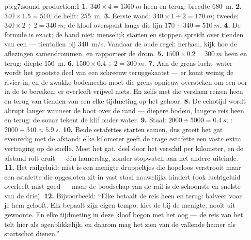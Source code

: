 \begin{solution}{pb:g7:sound-production:1}
\textbf{1.} $340 \times 4 = \qty{1360}{m}$ heen en terug: breedte
\qty{680}{m}.
\textbf{2.} $340 \times 1.5 = 510$; de helft: \qty{255}{m}.
\textbf{3.} Eerste wand: $340 \times 1 \div 2 = \qty{170}{m}$; tweede:
$340 \times 2 \div 2 = \qty{340}{m}$; de kloof overspant langs die lijn
$170 + 340 = \qty{510}{m}$.
\textbf{4.} De formule is exact; de hand niet: menselijk starten en
stoppen spreidt over tienden van een  --- tientallen
 bij \qty{340}{m/s}. Vandaar de oude regel: herhaal, kijk hoe
de aflezingen samendrommen, en rapporteer de drom.
\textbf{5.} $1500 \times 0.2 = \qty{300}{m}$ heen en terug: diepte
\qty{150}{m}.
\textbf{6.} $1500 \times 0.4 \div 2 = \qty{300}{m}$.
\textbf{7.} Aan de grens lucht--water wordt het grootste deel van een
schreeuw teruggekaatst --- er komt weinig de rivier in, en de zwakke
bodemecho moet die grens opnieuw oversteken om een oor in de
 te bereiken: er overleeft vrijwel niets. En zelfs met die
 verslaan reizen heen en terug van tienden van een  elke
tijdmeting op het gehoor.
\textbf{8.} De echotijd wordt abrupt langer wanneer de boot over de
rand  --- diepere bodem, langere reis heen en terug: de sonar
tekent de klif onder water.
\textbf{9.} Staal: $2000 \div 5000 = \qty{0.4}{s}$; : $2000
\div 340 \approx \qty{5.9}{s}$.
\textbf{10.} Beide estafettes starten samen, dus groeit het gat
evenredig met de afstand: elke kilometer geeft de trage estafette een
vaste extra vertraging op de snelle. Meet het gat, deel door het
verschil per kilometer, en de afstand rolt eruit --- één hamerslag,
zonder stopwatch aan het andere uiteinde.
\textbf{11.} Het railgeluid: mist is een menigte druppeltjes die
\emph{} hopeloos verstrooit maar een estafette die opgesloten
zit in vast staal nauwelijks hindert (ook luchtgeluid
overleeft mist goed --- maar de boodschap van de rail is de schoonste
en snelste van de drie).
\textbf{12.} Bijvoorbeeld: ``Elke  betaalt de reis heen en
terug: halveer voor je hem gelooft. Elk  bepaalt zijn eigen
tempo: kies de  bij de menigte, nooit uit gewoonte. En elke
tijdmeting in deze kloof begon met het oog --- de reis van het
 telt hier als ogenblikkelijk, en daarom mag het zien van de
vallende hamer als startschot dienen.''
\end{solution}
